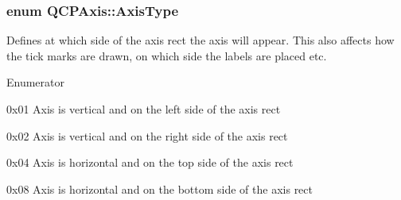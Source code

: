 \subsubsection[{Axis\+Type}]{\setlength{\rightskip}{0pt plus 5cm}enum {\bf Q\+C\+P\+Axis\+::\+Axis\+Type}}\label{class_q_c_p_axis_ae2bcc1728b382f10f064612b368bc18a}
Defines at which side of the axis rect the axis will appear. This also affects how the tick marks are drawn, on which side the labels are placed etc. \begin{Desc}
\item[Enumerator]\par
\begin{description}
\item[{\em 
\hypertarget{class_q_c_p_axis_ae2bcc1728b382f10f064612b368bc18aaf84aa6cac6fb6099f54a2cbf7546b730}{}at\+Left\label{class_q_c_p_axis_ae2bcc1728b382f10f064612b368bc18aaf84aa6cac6fb6099f54a2cbf7546b730}
}]{\ttfamily 0x01} Axis is vertical and on the left side of the axis rect \item[{\em 
\hypertarget{class_q_c_p_axis_ae2bcc1728b382f10f064612b368bc18aadf5509f7d29199ef2f263b1dd224b345}{}at\+Right\label{class_q_c_p_axis_ae2bcc1728b382f10f064612b368bc18aadf5509f7d29199ef2f263b1dd224b345}
}]{\ttfamily 0x02} Axis is vertical and on the right side of the axis rect \item[{\em 
\hypertarget{class_q_c_p_axis_ae2bcc1728b382f10f064612b368bc18aac0ece2b680d3f545e701f75af1655977}{}at\+Top\label{class_q_c_p_axis_ae2bcc1728b382f10f064612b368bc18aac0ece2b680d3f545e701f75af1655977}
}]{\ttfamily 0x04} Axis is horizontal and on the top side of the axis rect \item[{\em 
\hypertarget{class_q_c_p_axis_ae2bcc1728b382f10f064612b368bc18aa220d68888516b6c3b493d144f1ba438f}{}at\+Bottom\label{class_q_c_p_axis_ae2bcc1728b382f10f064612b368bc18aa220d68888516b6c3b493d144f1ba438f}
}]{\ttfamily 0x08} Axis is horizontal and on the bottom side of the axis rect \end{description}
\end{Desc}


